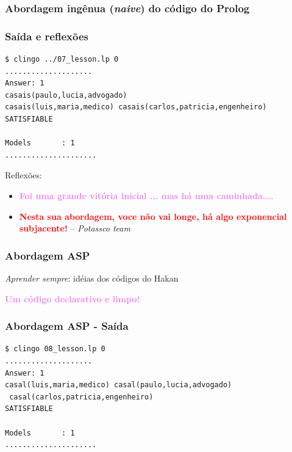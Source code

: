 \documentclass{beamer}
\begin{document}
\begin{frame}[allowframebreaks]
\frametitle{Abordagem ingênua (\emph{naive}) do código do Prolog}
		
	


\end{frame}


\begin{frame}[fragile] 
	\frametitle{Saída e reflexões}

{\small
\begin{verbatim}
$ clingo ../07_lesson.lp 0
....................
Answer: 1
casais(paulo,lucia,advogado) 
casais(luis,maria,medico) casais(carlos,patricia,engenheiro)
SATISFIABLE

Models       : 1
.....................
\end{verbatim}
}
Reflexões:
\pause
\begin{itemize}
\item \textcolor{violet}{\textbf{Foi uma grande vitória inicial ... mas há uma caminhada....}}		

\item \textcolor{red}{\textbf{Nesta sua abordagem, voce não vai longe, há algo exponencial subjacente!}} -- \emph{Potassco team}	
	

\end{itemize}	

\end{frame}




\begin{frame}[allowframebreaks]
\frametitle{Abordagem ASP}

\emph{Aprender sempre}: idéias dos códigos do Hakan	
	


\textcolor{violet}{\textbf{Um código declarativo e limpo!}}	

\end{frame}




\begin{frame}[fragile]

\frametitle{Abordagem ASP - Saída}

{\small
\begin{verbatim}
$ clingo 08_lesson.lp 0
....................
Answer: 1
casal(luis,maria,medico) casal(paulo,lucia,advogado)
 casal(carlos,patricia,engenheiro)
SATISFIABLE

Models       : 1
.....................
\end{verbatim}
}


\end{frame}
\end{document}
